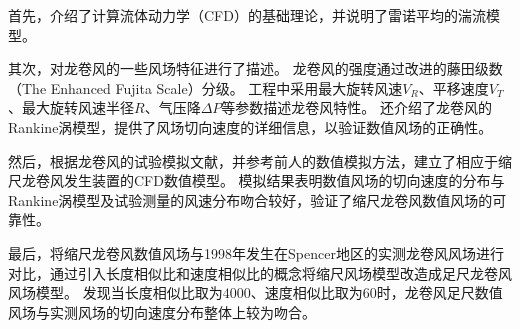 首先，介绍了计算流体动力学（CFD）的基础理论，并说明了雷诺平均的湍流模型。

其次，对龙卷风的一些风场特征进行了描述。
龙卷风的强度通过改进的藤田级数（The Enhanced Fujita Scale）分级。
工程中采用最大旋转风速$V_R$、平移速度$V_T$、最大旋转风速半径$R$、气压降$\Delta P$等参数描述龙卷风特性。
还介绍了龙卷风的Rankine涡模型，提供了风场切向速度的详细信息，以验证数值风场的正确性。

然后，根据龙卷风的试验模拟文献，并参考前人的数值模拟方法，建立了相应于缩尺龙卷风发生装置的CFD数值模型。
模拟结果表明数值风场的切向速度的分布与Rankine涡模型及试验测量的风速分布吻合较好，验证了缩尺龙卷风数值风场的可靠性。

最后，将缩尺龙卷风数值风场与1998年发生在Spencer地区的实测龙卷风风场进行对比，通过引入长度相似比和速度相似比的概念将缩尺风场模型改造成足尺龙卷风风场模型。
发现当长度相似比取为$4000$、速度相似比取为$60$时，龙卷风足尺数值风场与实测风场的切向速度分布整体上较为吻合。

